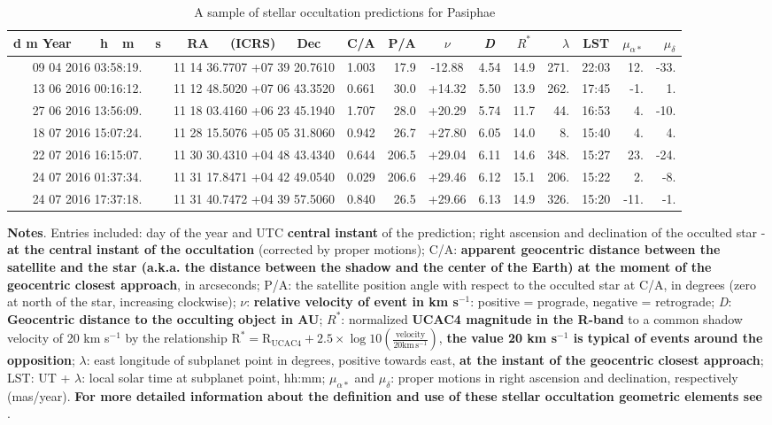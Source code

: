\documentclass[useAMS,usenatbib]{mn2e}
\begin{document}
\begin{table}
\caption{\label{Tab: sample-cds} A sample of stellar occultation predictions for Pasiphae}
\begin{center}
\begin{tabular}{cccrcccrcrr}
\hline
\hline
d m Year~~~~h~~m~~~s & RA~~~(ICRS)~~~Dec & C/A & P/A & $\nu$ &{\it D} & $R^*$ & $\lambda$ & LST & $\mu_{\alpha*}$ & $\mu_{\delta}$ \tabularnewline
\hline
09 04 2016 03:58:19. & 11 14 36.7707 +07 39 20.7610 & 1.003 &  17.9 & -12.88 &  4.54 & 14.9 & 271. & 22:03 &  12. & -33. \tabularnewline 
13 06 2016 00:16:12. & 11 12 48.5020 +07 06 43.3520 & 0.661 &  30.0 & +14.32 &  5.50 & 13.9 & 262. & 17:45 &  -1. &   1. \tabularnewline 
27 06 2016 13:56:09. & 11 18 03.4160 +06 23 45.1940 & 1.707 &  28.0 & +20.29 &  5.74 & 11.7 &  44. & 16:53 &   4. & -10. \tabularnewline 
18 07 2016 15:07:24. & 11 28 15.5076 +05 05 31.8060 & 0.942 &  26.7 & +27.80 &  6.05 & 14.0 &   8. & 15:40 &   4. &   4. \tabularnewline 
22 07 2016 16:15:07. & 11 30 30.4310 +04 48 43.4340 & 0.644 & 206.5 & +29.04 &  6.11 & 14.6 & 348. & 15:27 &  23. & -24. \tabularnewline 
24 07 2016 01:37:34. & 11 31 17.8471 +04 42 49.0540 & 0.029 & 206.6 & +29.46 &  6.12 & 15.1 & 206. & 15:22 &   2. &  -8. \tabularnewline 
24 07 2016 17:37:18. & 11 31 40.7472 +04 39 57.5060 & 0.840 &  26.5 & +29.66 &  6.13 & 14.9 & 326. & 15:20 & -11. &  -1. \tabularnewline 
\hline
\end{tabular}
\end{center}
\begin{flushleft}
\textbf{Notes}. Entries included: day of the year and UTC \textbf{central instant} of the prediction; right ascension and declination of the occulted star - \textbf{at the central instant of the occultation} (corrected by proper motions); C/A: \textbf{apparent geocentric distance between the satellite and the star (a.k.a. the distance between the shadow and the center of the Earth) at the moment of the geocentric closest approach}, in arcseconds; P/A: the satellite position angle with respect to the occulted star at C/A, in degrees (zero at north of the star, increasing clockwise); $\nu$: \textbf{relative velocity of event in km s$^{-1}$}: positive = prograde, negative = retrograde; {\it D}: \textbf{Geocentric distance to the occulting object in AU}; $R^*$: normalized \textbf{UCAC4 magnitude in the R-band} to a common shadow velocity of 20 km s$^{-1}$ by the relationship $\textrm{R}^* = \textrm{R}_{\textrm{UCAC4}} + 2.5 \times \log 10 \left(\frac{\textrm{velocity}} {20 \textrm{km}\, \textrm{s}^{-1}} \right)$, \textbf{the value 20 km s$^{-1}$ is typical of events around the opposition}; $\lambda$: east longitude of subplanet point in degrees, positive towards east, \textbf{at the instant of the geocentric closest approach}; LST: UT + $\lambda$: local solar time at subplanet point, hh:mm; $\mu_{\alpha *}$ and $\mu_{\delta}$: proper motions in right ascension and declination, respectively (mas/year). \textbf{For more detailed information about the definition and use of these stellar occultation geometric elements see \cite{Assafin2010}}.
\end{flushleft}
\end{table}
\end{document}
